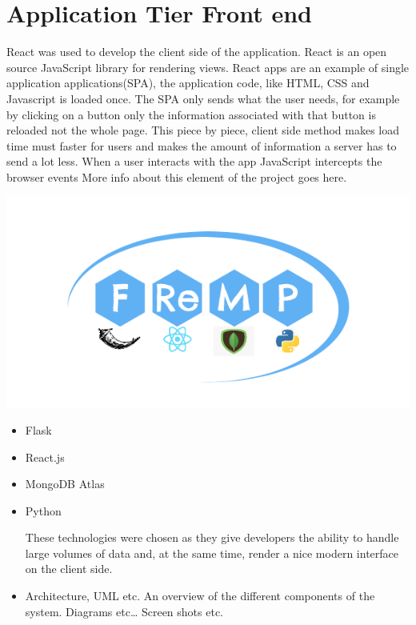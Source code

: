 \section{Application Tier Front end}
React was used to develop the client side of the application. React is an open source JavaScript library for rendering views. React apps are an example of single application applications(SPA), the application code, like HTML, CSS and Javascript is loaded once. The SPA only sends what the user needs, for example by clicking on a button only the information associated with that button is reloaded not the whole page. This piece by piece, client side method makes load time must faster for users and makes the amount of information a server has to send a lot less.
When a user interacts with the app JavaScript intercepts the browser events
More info about this element of the project goes here.
\begin{center}    
      \includegraphics{img/fremp.PNG}
\end{center}

\begin{itemize}
\item Flask
\item React.js
\item MongoDB Atlas
\item Python


These technologies were chosen as they give developers the ability to handle large volumes of data and, at the same time, render a nice modern interface on the client side. 
\item Architecture, UML etc. An overview of the different components of the system. Diagrams etc… Screen shots etc.
\end{itemize}

